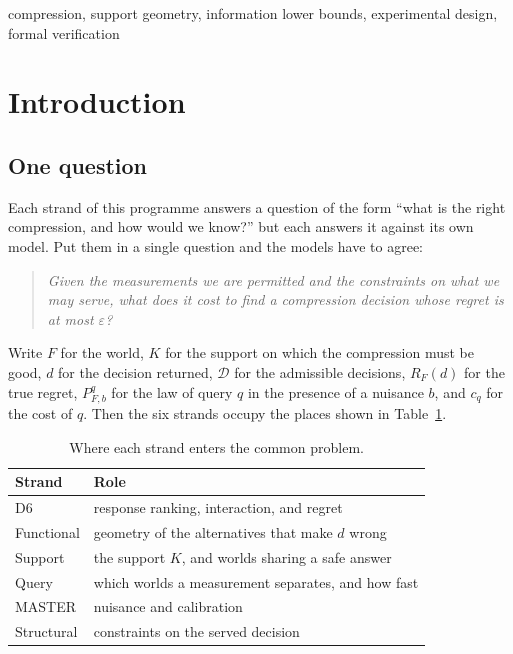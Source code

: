 \begin{IEEEkeywords}
compression, support geometry, information lower bounds, experimental design, formal
verification
\end{IEEEkeywords}

\section{Introduction}
\label{sec:intro}

\subsection{One question}

Each strand of this programme answers a question of the form ``what is the right
compression, and how would we know?'' but each answers it against its own model. Put them
in a single question and the models have to agree:

\begin{quote}
\emph{Given the measurements we are permitted and the constraints on what we may serve,
what does it cost to find a compression decision whose regret is at most $\varepsilon$?}
\end{quote}

Write $F$ for the world, $K$ for the support on which the compression must be good, $d$ for
the decision returned, $\mathcal{D}$ for the admissible decisions, $R_{F}(d)$ for the true
regret, $P^{q}_{F,b}$ for the law of query $q$ in the presence of a nuisance $b$, and
$c_{q}$ for the cost of $q$. Then the six strands occupy the places shown in
Table~\ref{tab:roles}.

\begin{table}[t]
\caption{Where each strand enters the common problem.}
\label{tab:roles}
\centering
\footnotesize
\begin{tabular}{@{}ll@{}}
\toprule
Strand & Role \\
\midrule
D6 & response ranking, interaction, and regret \\
Functional & geometry of the alternatives that make $d$ wrong \\
Support & the support $K$, and worlds sharing a safe answer \\
Query & which worlds a measurement separates, and how fast \\
MASTER & nuisance and calibration \\
Structural & constraints on the served decision \\
\bottomrule
\end{tabular}
\end{table}

